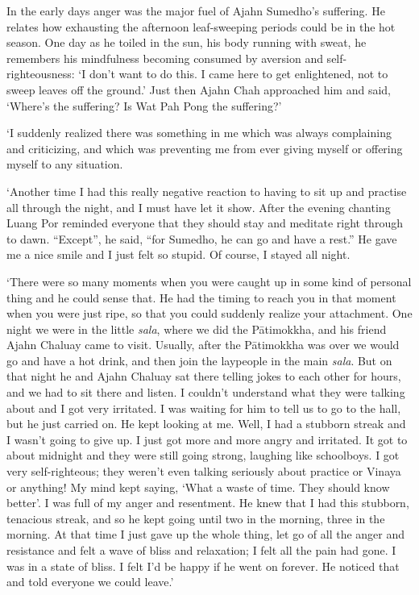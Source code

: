 In the early days anger was the major fuel of Ajahn Sumedho's suffering.
He relates how exhausting the afternoon leaf-sweeping periods could be
in the hot season. One day as he toiled in the sun, his body running
with sweat, he remembers his mindfulness becoming consumed by aversion
and self-righteousness: `I don't want to do this. I came here to get
enlightened, not to sweep leaves off the ground.' Just then Ajahn Chah
approached him and said, `Where's the suffering? Is Wat Pah Pong the
suffering?'

`I suddenly realized there was something in me which was always
complaining and criticizing, and which was preventing me from ever
giving myself or offering myself to any situation.

`Another time I had this really negative reaction to having to sit up
and practise all through the night, and I must have let it show. After
the evening chanting Luang Por reminded everyone that they should stay
and meditate right through to dawn. ``Except'', he said, ``for Sumedho,
he can go and have a rest.'' He gave me a nice smile and I just felt so
stupid. Of course, I stayed all night.

`There were so many moments when you were caught up in some kind of
personal thing and he could sense that. He had the timing to reach you
in that moment when you were just ripe, so that you could suddenly
realize your attachment. One night we were in the little \emph{sala},
where we did the Pātimokkha, and his friend Ajahn Chaluay came to visit.
Usually, after the Pātimokkha was over we would go and have a hot drink,
and then join the laypeople in the main \emph{sala}. But on that night
he and Ajahn Chaluay sat there telling jokes to each other for hours,
and we had to sit there and listen. I couldn't understand what they were
talking about and I got very irritated. I was waiting for him to tell us
to go to the hall, but he just carried on. He kept looking at me. Well,
I had a stubborn streak and I wasn't going to give up. I just got more
and more angry and irritated. It got to about midnight and they were
still going strong, laughing like schoolboys. I got very self-righteous;
they weren't even talking seriously about practice or Vinaya or
anything! My mind kept saying, `What a waste of time. They should know
better'. I was full of my anger and resentment. He knew that I had this
stubborn, tenacious streak, and so he kept going until two in the
morning, three in the morning. At that time I just gave up the whole
thing, let go of all the anger and resistance and felt a wave of bliss
and relaxation; I felt all the pain had gone. I was in a state of bliss.
I felt I'd be happy if he went on forever. He noticed that and told
everyone we could leave.'

